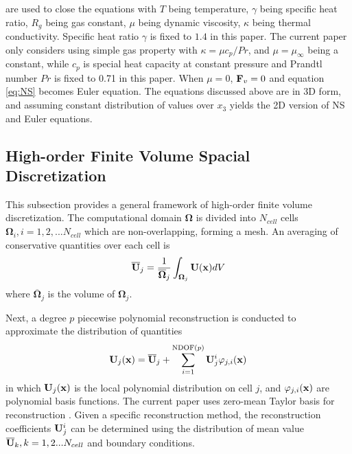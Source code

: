 \documentclass[preprint,12pt]{elsarticle}
\begin{document}
are used to close the equations
with $T$ being temperature, $\gamma$ being specific heat ratio,
$R_g$ being  gas constant, $\mu$ being dynamic viscosity,
$\kappa$ being thermal conductivity.
Specific heat ratio $\gamma$ is fixed to $1.4$ in this paper.
The current paper only
considers using simple gas property
with $\kappa = \mu c_p / Pr$,
and $\mu=\mu_{\infty}$ being a constant,
while $c_p$ is special heat capacity
at constant pressure and
Prandtl number $Pr$ is fixed to 0.71 in this paper.
When $\mu=0$,
$\mathbf{F}_v=0$ and
equation \eqref{eq:NS} becomes Euler equation.
The equations discussed above are in 3D form, and
assuming constant distribution of values over $x_3$
yields the 2D version of NS and Euler equations.

\subsection{High-order Finite Volume Spacial Discretization}
\label{ssec:FV}

\newcommand{\OO}{\mathbf{\Omega}}
\newcommand{\UM}{\overline{\U}}
\newcommand{\Fn}{\tilde{\F}}
\newcommand{\n}{\mathbf{n}}
\newcommand{\uu}{\overline{\mathbf{U}}}
\newcommand{\R}{\mathbf{R}}
\newcommand{\inc}{\mathrm\Delta}
\newcommand{\Tau}{\mathrm{T}}
\renewcommand{\real}{\mathrm{Re}}
\newcommand{\imag}{\mathrm{Im}}

\newcommand{\CFLt}{\text{CFL}_t}
\newcommand{\CFLtau}{\text{CFL}_\tau}

This subsection provides a general framework of
high-order
finite volume discretization.
The computational domain $\OO$ is divided
into $N_{cell}$ cells $\OO_i, i=1,2,...N_{cell}$ which
are non-overlapping, forming a mesh.
An averaging of conservative quantities
over each cell is
\begin{equation}
    \label{eq:FVMean}
    \UM_j = \frac{1}{\overline{\OO}_j}\int_{\OO_j}\U(\x)dV
\end{equation}
where $\overline{\OO}_j$ is the volume of $\OO_j$.

Next, a degree $p$ piecewise polynomial reconstruction is
conducted to approximate the distribution of
quantities
\begin{equation}
    \label{eq:FVRec}
    \U_j(\x) = \UM_j + \sum_{i=1}^{\mathrm{NDOF}(p)}{\U_j^i\varphi_{j,i}(\x) }
\end{equation}
in which $\mathbf{U}_j(\mathbf{x})$ is the local polynomial distribution on cell $j$,
and
$\varphi_{j,i}(\mathbf{x})$ are
polynomial basis functions.
The current paper uses zero-mean Taylor basis
for reconstruction \cite{wang2017compact_VR}.
Given a specific reconstruction method,
the reconstruction coefficients $\mathbf{U}_j^i$ can be determined using
the distribution of mean value $\UM_k, k=1,2...N_{cell}$
and boundary conditions.
\end{document}
